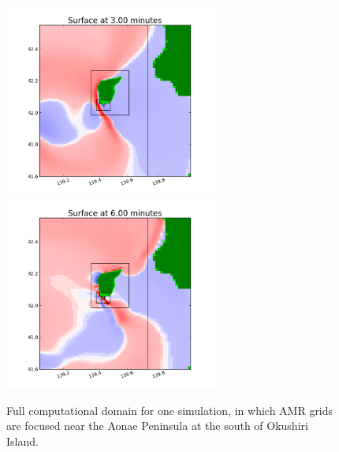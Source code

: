 \begin{figure}[ht]
\hfil\includegraphics[width=2.8in]{bp9/full_3min.png}\hfil
\hfil\includegraphics[width=2.8in]{bp9/full_6min.png}\hfil

\caption{\label{bp9full}
Full computational domain for one simulation, in which AMR grids are focused near the Aonae Peninsula at the south of Okushiri Island.
  }
\end{figure}

